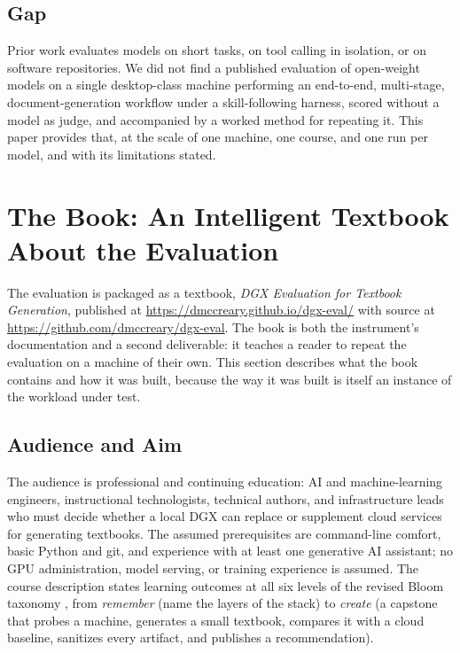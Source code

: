 \documentclass[11pt]{article}
\begin{document}
\subsection{Gap}

Prior work evaluates models on short tasks, on tool calling in isolation, or on software repositories. We did not find a published evaluation of open-weight models on a single desktop-class machine performing an end-to-end, multi-stage, document-generation workflow under a skill-following harness, scored without a model as judge, and accompanied by a worked method for repeating it. This paper provides that, at the scale of one machine, one course, and one run per model, and with its limitations stated.

\section{The Book: An Intelligent Textbook About the Evaluation}
\label{sec:book}

The evaluation is packaged as a textbook, \textit{DGX Evaluation for Textbook Generation}, published at \url{https://dmccreary.github.io/dgx-eval/} with source at \url{https://github.com/dmccreary/dgx-eval}. The book is both the instrument's documentation and a second deliverable: it teaches a reader to repeat the evaluation on a machine of their own. This section describes what the book contains and how it was built, because the way it was built is itself an instance of the workload under test.

\subsection{Audience and Aim}

The audience is professional and continuing education: AI and machine-learning engineers, instructional technologists, technical authors, and infrastructure leads who must decide whether a local DGX can replace or supplement cloud services for generating textbooks. The assumed prerequisites are command-line comfort, basic Python and git, and experience with at least one generative AI assistant; no GPU administration, model serving, or training experience is assumed. The course description states learning outcomes at all six levels of the revised Bloom taxonomy \cite{anderson2001taxonomy}, from \textit{remember} (name the layers of the stack) to \textit{create} (a capstone that probes a machine, generates a small textbook, compares it with a cloud baseline, sanitizes every artifact, and publishes a recommendation).
\end{document}
